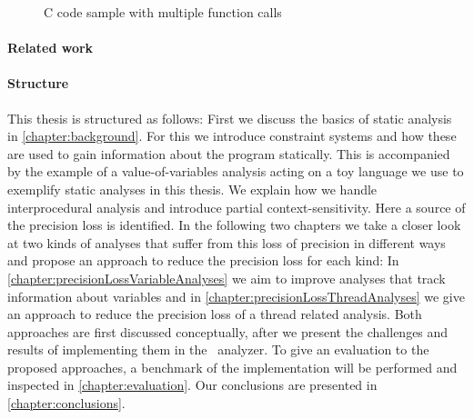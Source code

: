   \begin{figure}
    \centering
    \begin{subfigure}{0.35\textwidth}
      \centering
      
    \end{subfigure}
    \caption{C code sample with multiple function calls}
    \label{fig:exampleIntro}
  \end{figure}


\paragraph{Related work}

\paragraph{Structure} 
This thesis is structured as follows: First we discuss the basics of static analysis in \autoref{chapter:background}. For this we introduce constraint systems and how these are used to gain information about the program statically. This is accompanied by the example of a value-of-variables analysis acting on a toy language we use to exemplify static analyses in this thesis. We explain how we handle interprocedural analysis and introduce partial context-sensitivity. Here a source of the precision loss is identified. In the following two chapters we take a closer look at two kinds of analyses that suffer from this loss of precision in different ways and propose an approach to reduce the precision loss for each kind: In \autoref{chapter:precisionLossVariableAnalyses} we aim to improve analyses that track information about variables and in \autoref{chapter:precisionLossThreadAnalyses} we give an approach to reduce the precision loss of a thread related analysis. Both approaches are first discussed conceptually, after we present the challenges and results of implementing them in the \gob\ analyzer. To give an evaluation to the proposed approaches, a benchmark of the implementation will be performed and inspected in \autoref{chapter:evaluation}. Our conclusions are presented in \autoref{chapter:conclusions}.
